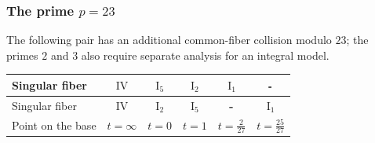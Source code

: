 \documentclass[a4paper]{amsart}
\theoremstyle{plain}
\theoremstyle{definition}
\theoremstyle{remark}
\numberwithin{equation}{section}
\begin{document}
%

\medskip
\subsubsection*{The prime $p=23$}
The following pair has an additional common-fiber collision modulo $23$;
the primes $2$ and $3$ also require separate analysis for an integral
model.
\begin{table}[H]
	\centering
	\renewcommand{\arraystretch}{1.2}
	\begin{tabular}{lccccc}
		\toprule
		Singular fiber
		& $\mathrm{IV}$
		& $\mathrm{I}_{5}$
		& $\mathrm{I}_{2}$ & $\mathrm{I}_{1}$ & $\textup{\textbf{-}}$ \\
		\midrule
		\toprule
		Singular fiber
		& $\mathrm{IV}$
		& $\mathrm{I}_{2}$
		& $\mathrm{I}_{5}$ & $\textup{\textbf{-}}$ & $\mathrm{I}_{1}$ \\
		\midrule
		Point on the base & $t=\infty$ & $t=0$ & $t=1$ & $t=\frac{2}{27}$  & $t=\frac{25}{27}$\\
		\bottomrule
	\end{tabular}
\end{table}
\end{document}
